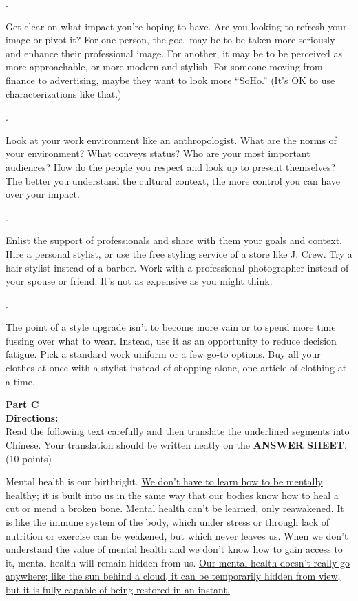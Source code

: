 \linefill.

Get clear on what impact you're hoping to have. Are you looking to
refresh your image or pivot it? For one person, the goal may be to be
taken more seriously and enhance their professional image. For
another, it may be to be perceived as more approachable, or more
modern and stylish. For someone moving from finance to advertising,
maybe they want to look more ``SoHo.'' (It's OK to use
characterizations like that.)

\linefill.

Look at your work environment like an anthropologist. What are the
norms of your environment? What conveys status? Who are your most
important audiences? How do the people you respect and look up to
present themselves? The better you understand the cultural context, the
more control you can have over your impact.

\linefill.

Enlist the support of professionals and share with them your goals
and context. Hire a personal stylist, or use the free styling service
of a store like J. Crew. Try a hair stylist instead of a barber. Work
with a professional photographer instead of your spouse or friend. It's
not as expensive as you might think.

\linefill.

The point of a style upgrade isn't to become more vain or to spend
more time fussing over what to wear. Instead, use it as an opportunity
to reduce decision fatigue. Pick a standard work uniform or a few go-to
options. Buy all your clothes at once with a stylist instead of
shopping alone, one article of clothing at a time.

\newpage
\noindent
\textbf{Part C}\\
\textbf{ Directions:}\\
Read the following text carefully and then translate the
	underlined segments into Chinese. Your translation should be written
	neatly on the \textbf{ANSWER SHEET}. (10 points)

\TiGanSpace


Mental health is our birthright. \transnum \uline{We don't have to learn
	how to be mentally healthy; it is built into us in the same way
	that our bodies know how to heal a cut or mend a broken bone.} Mental
health can't be learned, only reawakened. It is like the immune system
of the body, which under stress or through lack of nutrition or
exercise can be weakened, but which never leaves us. When we don't
understand the value of mental health and we don't know how to gain
access to it, mental health will remain hidden from us. 
\transnum \uline{Our mental health doesn't really go anywhere; like the sun
	behind a cloud, it can be temporarily hidden from view, but it is
	fully capable of being restored in an instant.}

